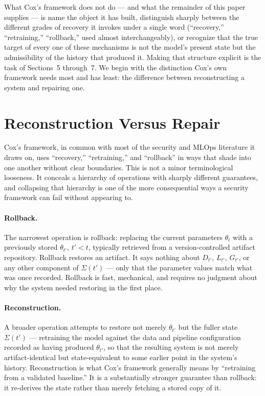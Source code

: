 \documentclass[11pt]{article}
\begin{document}
What Cox's framework does not do --- and what the remainder of this paper supplies --- is name the object it has built, distinguish sharply between the different grades of recovery it invokes under a single word (``recovery,'' ``retraining,'' ``rollback,'' used almost interchangeably), or recognize that the true target of every one of these mechanisms is not the model's present state but the admissibility of the history that produced it. Making that structure explicit is the task of Sections~5 through~7. We begin with the distinction Cox's own framework needs most and has least: the difference between reconstructing a system and repairing one.

\section{Reconstruction Versus Repair}

Cox's framework, in common with most of the security and MLOps literature it draws on, uses ``recovery,'' ``retraining,'' and ``rollback'' in ways that shade into one another without clear boundaries. This is not a minor terminological looseness. It conceals a hierarchy of operations with sharply different guarantees, and collapsing that hierarchy is one of the more consequential ways a security framework can fail without appearing to.

\paragraph{Rollback.} The narrowest operation is rollback: replacing the current parameters $\theta_t$ with a previously stored $\theta_{t'}$, $t' < t$, typically retrieved from a version-controlled artifact repository. Rollback restores an artifact. It says nothing about $D_{t'}$, $L_{t'}$, $G_{t'}$, or any other component of $\Sigma(t')$ --- only that the parameter values match what was once recorded. Rollback is fast, mechanical, and requires no judgment about why the system needed restoring in the first place.

\paragraph{Reconstruction.} A broader operation attempts to restore not merely $\theta_{t'}$ but the fuller state $\Sigma(t')$ --- retraining the model against the data and pipeline configuration recorded as having produced $\theta_{t'}$, so that the resulting system is not merely artifact-identical but state-equivalent to some earlier point in the system's history. Reconstruction is what Cox's framework generally means by ``retraining from a validated baseline.'' It is a substantially stronger guarantee than rollback: it re-derives the state rather than merely fetching a stored copy of it.
\end{document}
